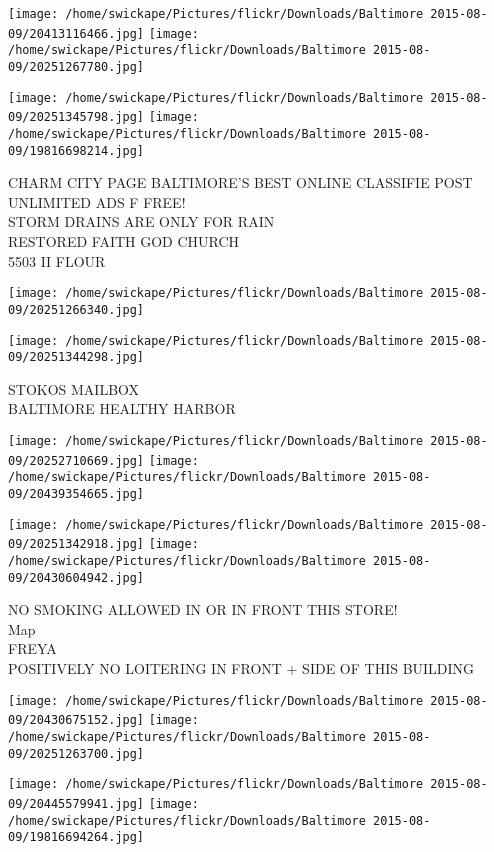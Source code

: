 \documentclass[10pt,letterpaper]{article}
\begin{document}
\texttt{[image: /home/swickape/Pictures/flickr/Downloads/Baltimore 2015-08-09/20413116466.jpg]}
\texttt{[image: /home/swickape/Pictures/flickr/Downloads/Baltimore 2015-08-09/20251267780.jpg]}

\texttt{[image: /home/swickape/Pictures/flickr/Downloads/Baltimore 2015-08-09/20251345798.jpg]}
\texttt{[image: /home/swickape/Pictures/flickr/Downloads/Baltimore 2015-08-09/19816698214.jpg]}

CHARM CITY PAGE BALTIMORE'S BEST ONLINE CLASSIFIE POST UNLIMITED ADS F FREE!\\
STORM DRAINS ARE ONLY FOR RAIN\\
RESTORED FAITH GOD CHURCH\\
5503 II FLOUR\\
\pagebreak

\texttt{[image: /home/swickape/Pictures/flickr/Downloads/Baltimore 2015-08-09/20251266340.jpg]}

\vspace{0.25in}
\texttt{[image: /home/swickape/Pictures/flickr/Downloads/Baltimore 2015-08-09/20251344298.jpg]}

STOKOS MAILBOX\\
BALTIMORE HEALTHY HARBOR\\
\pagebreak

\texttt{[image: /home/swickape/Pictures/flickr/Downloads/Baltimore 2015-08-09/20252710669.jpg]}
\texttt{[image: /home/swickape/Pictures/flickr/Downloads/Baltimore 2015-08-09/20439354665.jpg]}

\texttt{[image: /home/swickape/Pictures/flickr/Downloads/Baltimore 2015-08-09/20251342918.jpg]}
\texttt{[image: /home/swickape/Pictures/flickr/Downloads/Baltimore 2015-08-09/20430604942.jpg]}

NO SMOKING ALLOWED IN OR IN FRONT THIS STORE!\\
Map\\
FREYA\\
POSITIVELY NO LOITERING IN FRONT + SIDE OF THIS BUILDING\\
\pagebreak

\texttt{[image: /home/swickape/Pictures/flickr/Downloads/Baltimore 2015-08-09/20430675152.jpg]}
\texttt{[image: /home/swickape/Pictures/flickr/Downloads/Baltimore 2015-08-09/20251263700.jpg]}

\texttt{[image: /home/swickape/Pictures/flickr/Downloads/Baltimore 2015-08-09/20445579941.jpg]}
\texttt{[image: /home/swickape/Pictures/flickr/Downloads/Baltimore 2015-08-09/19816694264.jpg]}
\end{document}
